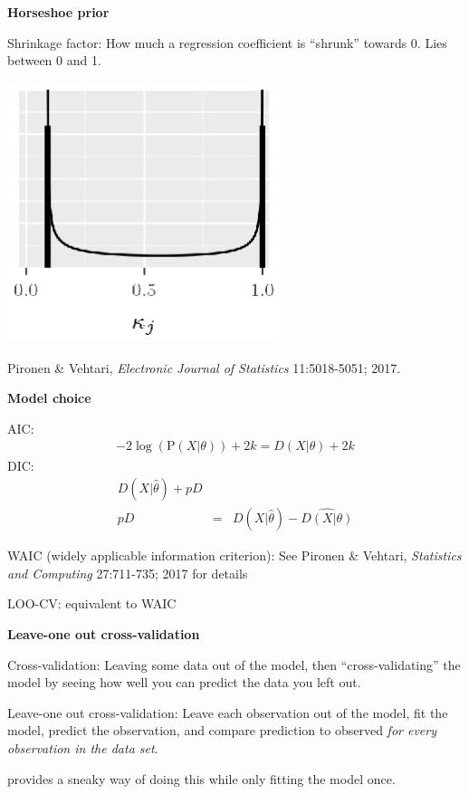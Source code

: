 \documentclass[titlepage,landscape,pdftex]{seminar}
\newcommand{\heading}[1]{{\color{red}\large\bf#1}}
\begin{document}
\begin{slide}
  \heading{Horseshoe prior}

  \noindent Shrinkage factor: How much a regression coefficient is
  ``shrunk'' towards 0. Lies between 0 and 1.

  \begin{center}
    \includegraphics[width=0.6\textwidth]{horseshoe-prior.eps}
  \end{center}

  Pironen \& Vehtari, {\it Electronic Journal of Statistics}
  11:5018-5051; 2017.

\end{slide}

\begin{slide}
  \heading{Model choice}


AIC:
\begin{eqnarray*}
  -2\log(\mbox{P}(X|\theta)) + 2k = D(X|\theta) + 2k
\end{eqnarray*}
DIC:
\begin{eqnarray*}
D(X|\hat\theta) + pD \\
pD &=& D(X|\hat\theta) - \widehat{D(X|\theta)}
\end{eqnarray*}

\vfill


WAIC (widely applicable information criterion): See Pironen \&
Vehtari, {\it Statistics and Computing} 27:711-735; 2017 for details

LOO-CV: equivalent to WAIC

\end{slide}

\begin{slide}
  \heading{Leave-one out cross-validation}

  \noindent Cross-validation: Leaving some data out of the model, then
  ``cross-validating'' the model by seeing how well you can predict
  the data you left out.

  \noindent Leave-one out cross-validation: Leave each observation out
  of the model, fit the model, predict the observation, and compare
  prediction to observed {\it for every observation in the data set}.

   provides a sneaky way of doing this while only
  fitting the model once.

\end{slide}
\end{document}
